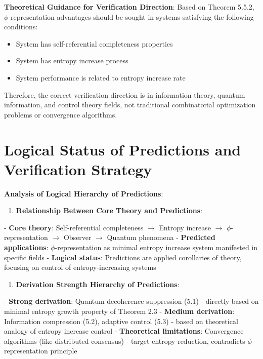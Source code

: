 \textbf{Theoretical Guidance for Verification Direction}:
Based on Theorem 5.5.2, $\phi$-representation advantages should be sought in systems satisfying the following conditions:

\begin{itemize}
\item System has self-referential completeness properties
\item System has entropy increase process
\item System performance is related to entropy increase rate
\end{itemize}

Therefore, the correct verification direction is in information theory, quantum information, and control theory fields, not traditional combinatorial optimization problems or convergence algorithms.

\section{Logical Status of Predictions and Verification Strategy}
\label{sec:ch05_applications:logical-status-of-predictions-and-verification-strategy}

\textbf{Analysis of Logical Hierarchy of Predictions}:

\begin{enumerate}
\item \textbf{Relationship Between Core Theory and Predictions}:
\end{enumerate}
   - \textbf{Core theory}: Self-referential completeness $\rightarrow$ Entropy increase $\rightarrow$ $\phi$-representation $\rightarrow$ Observer $\rightarrow$ Quantum phenomena
   - \textbf{Predicted applications}: $\phi$-representation as minimal entropy increase system manifested in specific fields
   - \textbf{Logical status}: Predictions are applied corollaries of theory, focusing on control of entropy-increasing systems

\begin{enumerate}
\item \textbf{Derivation Strength Hierarchy of Predictions}:
\end{enumerate}
   - \textbf{Strong derivation}: Quantum decoherence suppression (5.1) - directly based on minimal entropy growth property of Theorem 2.3
   - \textbf{Medium derivation}: Information compression (5.2), adaptive control (5.3) - based on theoretical analogy of entropy increase control
   - \textbf{Theoretical limitations}: Convergence algorithms (like distributed consensus) - target entropy reduction, contradicts $\phi$-representation principle
   
